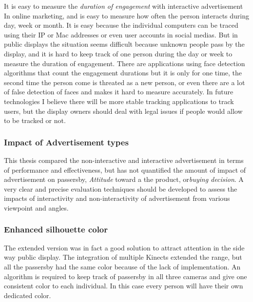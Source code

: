 It is easy to measure the \emph{duration of engagement} with interactive advertisement In online marketing, and is easy to measure how often the person interacts during day, week or month. It is easy because the individual computers can be traced using their IP or Mac addresses or even user accounts in social medias. But in public displays the situation seems difficult because unknown people pass by the display, and it is hard to keep track of one person during the day or week to measure the duration of engagement. There are applications \cite{glancingcount} using face detection algorithms that count the engagement durations but it is only for one time, the second time the person come is threated as a new person, or even there are a lot of false detection of faces and makes it hard to measure accurately. In future technologies I believe there will be more stable tracking applications to track users, but the display owners should deal with legal issues if people would allow to be tracked or not. 

\subsubsection{Impact of Advertisement types}
This thesis compared the non-interactive and interactive advertisement in terms of performance and effectiveness, but has not quantified the amount of impact of advertisement on passersby, \emph{Attitude} toward a the product, or\emph{buying decision}. A very clear and precise evaluation techniques should be developed to assess the impacts of interactivity and non-interactivity of advertisement from various viewpoint and angles.

\subsubsection{Enhanced silhouette color}
The extended version was in fact a good solution to attract attention in the side way public display. The integration of multiple Kinects extended the range, but all the passersby had the same color because of the lack of implementation. An algorithm is required to keep track of passersby in all three cameras and give one consistent color to each individual. In this case every person will have their own dedicated color.

